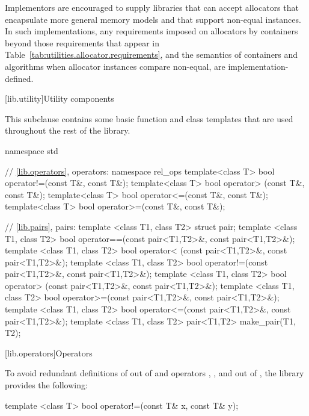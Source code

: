 \pnum
Implementors are encouraged to supply libraries that can accept allocators that
encapsulate more general memory models and that support non-equal instances.
In such implementations, any requirements imposed on allocators by containers
beyond those requirements that appear in Table~\ref{tab:utilities.allocator.requirements},
and the semantics of containers and algorithms when allocator instances compare
non-equal, are implementation-defined.

[lib.utility]{Utility components}

\pnum
This subclause contains some basic function and class templates that are used
throughout the rest of the library.

%
%

\begin{codeblock}
namespace std {
  // \ref{lib.operators}, operators:
  namespace rel_ops {
    template<class T> bool operator!=(const T&, const T&);
    template<class T> bool operator> (const T&, const T&);
    template<class T> bool operator<=(const T&, const T&);
    template<class T> bool operator>=(const T&, const T&);
  }

  // \ref{lib.pairs}, pairs:
  template <class T1, class T2> struct pair;
  template <class T1, class T2>
    bool operator==(const pair<T1,T2>&, const pair<T1,T2>&);
  template <class T1, class T2>
    bool operator< (const pair<T1,T2>&, const pair<T1,T2>&);
  template <class T1, class T2>
    bool operator!=(const pair<T1,T2>&, const pair<T1,T2>&);
  template <class T1, class T2>
    bool operator> (const pair<T1,T2>&, const pair<T1,T2>&);
  template <class T1, class T2>
    bool operator>=(const pair<T1,T2>&, const pair<T1,T2>&);
  template <class T1, class T2>
    bool operator<=(const pair<T1,T2>&, const pair<T1,T2>&);
  template <class T1, class T2> pair<T1,T2> make_pair(T1, T2);
}
\end{codeblock}

[lib.operators]{Operators}

\pnum
To avoid redundant definitions of  out of 
and operators \tcode{>}, \tcode{<=}, and \tcode{>=} out of ,
the library provides the following:

%
\begin{itemdecl}
template <class T> bool operator!=(const T& x, const T& y);
\end{itemdecl}

